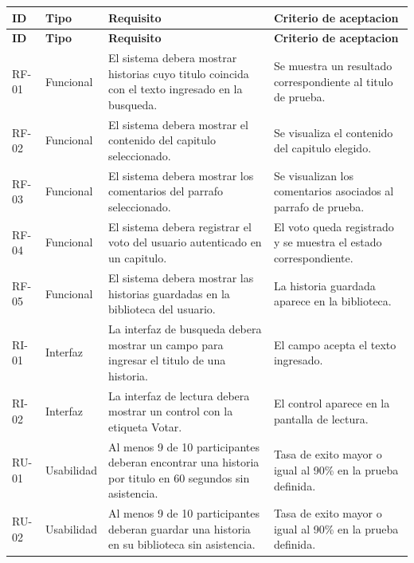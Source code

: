 \documentclass[11pt,a4paper]{article}
\begin{document}
\footnotesize
\begin{longtable}{|p{1.1cm}|p{1.6cm}|p{5.1cm}|p{5.1cm}|}
\hline
\textbf{ID} & \textbf{Tipo} &
\textbf{Requisito} &
\textbf{Criterio de aceptacion} \\ \hline
\endfirsthead

\hline
\textbf{ID} & \textbf{Tipo} &
\textbf{Requisito} &
\textbf{Criterio de aceptacion} \\ \hline
\endhead

RF-01 & Funcional &
El sistema debera mostrar historias cuyo
titulo coincida con el texto ingresado
en la busqueda. &
Se muestra un resultado correspondiente
al titulo de prueba. \\ \hline

RF-02 & Funcional &
El sistema debera mostrar el contenido
del capitulo seleccionado. &
Se visualiza el contenido del capitulo
elegido. \\ \hline

RF-03 & Funcional &
El sistema debera mostrar los comentarios
del parrafo seleccionado. &
Se visualizan los comentarios asociados
al parrafo de prueba. \\ \hline

RF-04 & Funcional &
El sistema debera registrar el voto
del usuario autenticado en un capitulo. &
El voto queda registrado y se muestra
el estado correspondiente. \\ \hline

RF-05 & Funcional &
El sistema debera mostrar las historias
guardadas en la biblioteca del usuario. &
La historia guardada aparece
en la biblioteca. \\ \hline

RI-01 & Interfaz &
La interfaz de busqueda debera mostrar
un campo para ingresar el titulo
de una historia. &
El campo acepta el texto ingresado. \\ \hline

RI-02 & Interfaz &
La interfaz de lectura debera mostrar
un control con la etiqueta Votar. &
El control aparece en la pantalla
de lectura. \\ \hline

RU-01 & Usabilidad &
Al menos 9 de 10 participantes deberan
encontrar una historia por titulo
en 60 segundos sin asistencia. &
Tasa de exito mayor o igual al 90\%
en la prueba definida. \\ \hline

RU-02 & Usabilidad &
Al menos 9 de 10 participantes deberan
guardar una historia en su biblioteca
sin asistencia. &
Tasa de exito mayor o igual al 90\%
en la prueba definida. \\ \hline


\end{longtable}
\end{document}
